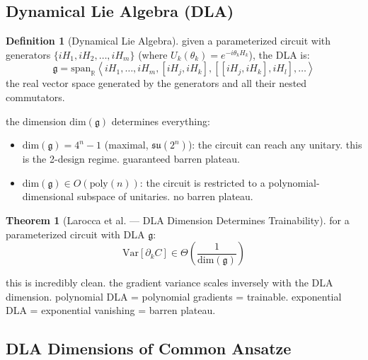 \documentclass[11pt,a4paper]{article}
\theoremstyle{definition}
\newtheorem{definition}{Definition}[section]
\newtheorem{theorem}{Theorem}[section]
\theoremstyle{remark}
\begin{document}
\subsection{Dynamical Lie Algebra (DLA)}

\begin{definition}[Dynamical Lie Algebra]
given a parameterized circuit with generators $\{iH_1, iH_2, \ldots, iH_m\}$ (where $U_k(\theta_k) = e^{-i\theta_k H_k}$), the DLA is:
\begin{equation}
    \mathfrak{g} = \text{span}_{\mathbb{R}}\left\langle iH_1, \ldots, iH_m, [iH_j, iH_k], [[iH_j, iH_k], iH_l], \ldots \right\rangle
\end{equation}
the real vector space generated by the generators and all their nested commutators.
\end{definition}

the dimension $\text{dim}(\mathfrak{g})$ determines everything:
\begin{itemize}
    \item $\text{dim}(\mathfrak{g}) = 4^n - 1$ (maximal, $\mathfrak{su}(2^n)$): the circuit can reach any unitary. this is the 2-design regime. guaranteed barren plateau.
    \item $\text{dim}(\mathfrak{g}) \in O(\text{poly}(n))$: the circuit is restricted to a polynomial-dimensional subspace of unitaries. no barren plateau.
\end{itemize}

\begin{theorem}[Larocca et al. --- DLA Dimension Determines Trainability]
for a parameterized circuit with DLA $\mathfrak{g}$:
\begin{equation}
    \text{Var}[\partial_k C] \in \Theta\left(\frac{1}{\text{dim}(\mathfrak{g})}\right)
\end{equation}
\end{theorem}

this is incredibly clean. the gradient variance scales inversely with the DLA dimension. polynomial DLA = polynomial gradients = trainable. exponential DLA = exponential vanishing = barren plateau.

\subsection{DLA Dimensions of Common Ansatze}
\end{document}
